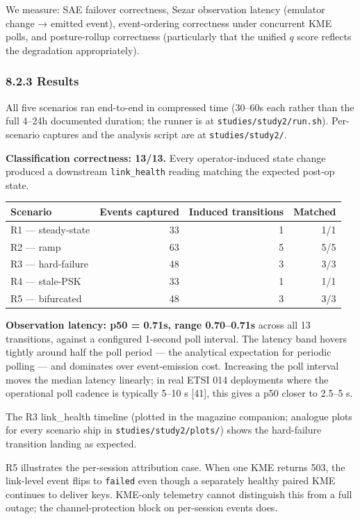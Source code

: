 We measure: SAE failover correctness, Sezar observation latency
(emulator change → emitted event), event-ordering correctness under
concurrent KME polls, and posture-rollup correctness (particularly that
the unified \(q\) score reflects the degradation appropriately).

\subsubsection{8.2.3 Results}\label{results}

All five scenarios ran end-to-end in compressed time (30--60s each
rather than the full 4--24h documented duration; the runner is at
\texttt{studies/study2/run.sh}). Per-scenario captures and the analysis
script are at \texttt{studies/study2/}.

\textbf{Classification correctness: 13/13.} Every operator-induced state
change produced a downstream \texttt{link\_health} reading matching the
expected post-op state.

\begin{longtable}[]{@{}lrrr@{}}
\toprule\noalign{}
Scenario & Events captured & Induced transitions & Matched \\
\midrule\noalign{}
\endhead
\bottomrule\noalign{}
\endlastfoot
R1 --- steady-state & 33 & 1 & 1/1 \\
R2 --- ramp & 63 & 5 & 5/5 \\
R3 --- hard-failure & 48 & 3 & 3/3 \\
R4 --- stale-PSK & 33 & 1 & 1/1 \\
R5 --- bifurcated & 48 & 3 & 3/3 \\
\end{longtable}

\textbf{Observation latency: p50 = 0.71s, range 0.70--0.71s} across all
13 transitions, against a configured 1-second poll interval. The latency
band hovers tightly around half the poll period --- the analytical
expectation for periodic polling --- and dominates over event-emission
cost. Increasing the poll interval moves the median latency linearly; in
real ETSI 014 deployments where the operational poll cadence is
typically 5--10 s {[}41{]}, this gives a p50 closer to 2.5--5 s.

The R3 link\_health timeline (plotted in the magazine companion;
analogue plots for every scenario ship in
\texttt{studies/study2/plots/}) shows the hard-failure transition
landing as expected.

R5 illustrates the per-session attribution case. When one KME returns
503, the link-level event flips to \texttt{failed} even though a
separately healthy paired KME continues to deliver keys. KME-only
telemetry cannot distinguish this from a full outage; the
channel-protection block on per-session events does.

